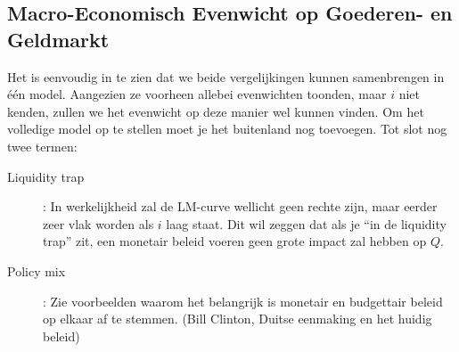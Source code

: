 \subsection{Macro-Economisch Evenwicht op Goederen- en Geldmarkt}
Het is eenvoudig in te zien dat we beide vergelijkingen kunnen samenbrengen in \'e\'en model. Aangezien ze voorheen allebei evenwichten toonden, maar $i$ niet kenden, zullen we het evenwicht op deze manier wel kunnen vinden. Om het volledige model op te stellen moet je het buitenland nog toevoegen. Tot slot nog twee termen:

\begin{description}
  \item[Liquidity trap]: In werkelijkheid zal de LM-curve wellicht geen rechte zijn, maar eerder zeer vlak worden als $i$ laag staat. Dit wil zeggen dat als je ``in de liquidity trap'' zit, een monetair beleid voeren geen grote impact zal hebben op $Q$.
  \item[Policy mix]: Zie voorbeelden waarom het belangrijk is monetair en budgettair beleid op elkaar af te stemmen. (Bill Clinton, Duitse eenmaking en het huidig beleid)
\end{description}
